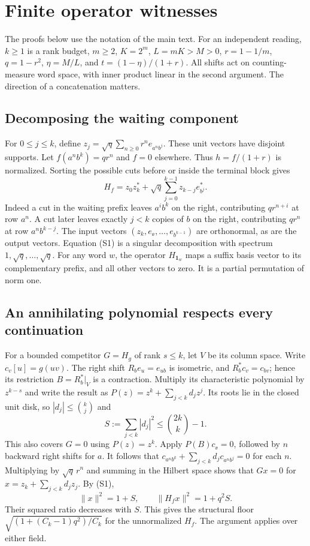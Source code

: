 \section{Finite operator witnesses}\label{app:op}
The proofs below use the notation of the main text. For an independent reading, \(k\ge1\) is a rank budget, \(m\ge2\), \(K=2^m\), \(L=mK>M>0\), \(r=1-1/m\), \(q=1-r^2\), \(\eta=M/L\), and \(t=(1-\eta)/(1+r)\). All shifts act on counting-measure word space, with inner product linear in the second argument. The direction of a concatenation matters.

\subsection{Decomposing the waiting component}
For \(0\le j\le k\), define \(z_j=\sqrt q\sum_{n\ge0}r^n e_{a^n b^j}\). These unit vectors have disjoint supports. Let \(f(a^n b^k)=qr^n\) and \(f=0\) elsewhere. Thus \(h=f/(1+r)\) is normalized. Sorting the possible cuts before or inside the terminal block gives
\[
 H_f=z_0z_k^*+\sqrt q\sum_{j=0}^{k-1}z_{k-j}e_{b^j}^* .
 \tag{S1}
\]
Indeed a cut in the waiting prefix leaves \(a^i b^k\) on the right, contributing \(qr^{n+i}\) at row \(a^n\). A cut later leaves exactly \(j<k\) copies of \(b\) on the right, contributing \(qr^n\) at row \(a^n b^{k-j}\). The input vectors \((z_k,e_{\ee},\ldots,e_{b^{k-1}})\) are orthonormal, as are the output vectors. Equation (S1) is a singular decomposition with spectrum \(1,\sqrt q,\ldots,\sqrt q\). For any word \(w\), the operator \(H_{\mathbf 1_w}\) maps a suffix basis vector to its complementary prefix, and all other vectors to zero. It is a partial permutation of norm one.

\subsection{An annihilating polynomial respects every continuation}
For a bounded competitor \(G=H_g\) of rank \(s\le k\), let \(V\) be its column space. Write \(c_v[u]=g(uv)\). The right shift \(R_b e_u=e_{ub}\) is isometric, and \(R_b^*c_v=c_{bv}\); hence its restriction \(B=R_b^*|_V\) is a contraction. Multiply its characteristic polynomial by \(z^{k-s}\) and write the result as \(P(z)=z^k+\sum_{j<k}d_jz^j\). Its roots lie in the closed unit disk, so \(|d_j|\le\binom{k}{j}\) and
\[
 S:=\sum_{j<k}|d_j|^2\le \binom{2k}{k}-1.
\]
This also covers \(G=0\) using \(P(z)=z^k\). Apply \(P(B)c_\ee=0\), followed by \(n\) backward right shifts for \(a\). It follows that \(c_{a^n b^k}+\sum_{j<k}d_j c_{a^n b^j}=0\) for each \(n\). Multiplying by \(\sqrt q\,r^n\) and summing in the Hilbert space shows that \(Gx=0\) for \(x=z_k+\sum_{j<k}d_jz_j\). By (S1),
\[
 \|x\|^2=1+S,\qquad \|H_f x\|^2=1+q^2S .
\]
Their squared ratio decreases with \(S\). This gives the structural floor \(\sqrt{(1+(C_k-1)q^2)/C_k}\) for the unnormalized \(H_f\). The argument applies over either field.

